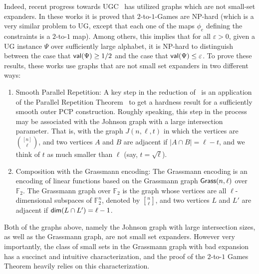 \documentclass[11pt]{article}
\def \eps {{\varepsilon}}
\theoremstyle{definition}
\begin{document}
Indeed, recent progress towards UGC~\cite{KhotMS17,DBLP:conf/stoc/DinurKKMS18a,DinurKKMS18,KhotMS18}
has utilized graphs which are not small-set expanders. In these 
works it is proved that $2$-to-$1$-Games are NP-hard (which is a 
very similar problem to UG, except that 
each one of the maps $\phi_e$ defining the constraints 
is a $2$-to-$1$ map). Among others, this implies that for all $\eps > 0$, given
a UG instance $\Psi$ over sufficiently large alphabet, 
it is NP-hard to distinguish between the case that 
${\sf val}(\Psi)\geq 1/2$ and the case that 
${\sf val}(\Psi)\leq \eps$. To prove these results, these works
use graphs that are not small set expanders in two different ways:
\begin{enumerate}
    \item Smooth Parallel Repetition: A key step in the reduction     of~\cite{KhotMS17,DBLP:conf/stoc/DinurKKMS18a,DinurKKMS18,KhotMS18} is an application of the Parallel Repetition Theorem~\cite{Raz} to get a hardness result 
    for a sufficiently 
    smooth outer PCP construction. Roughly speaking, this 
    step in the process may be associated with the Johnson graph
    with a large intersection parameter. That is, with the graph 
    $J(n,\ell,t)$ in which the vertices are $\binom{[n]}{\ell}$, and 
    two vertices $A$ and $B$ are adjacent if $|A\cap B|=\ell-t$, 
    and we think of $t$ as much smaller than $\ell$ (say, $t=\sqrt{\ell}$).
    \item Composition with the Grassmann encoding: The Grassmann
    encoding is an encoding of linear functions based on the Grassmann graph 
    ${\sf Grass}(n,\ell)$ over $\mathbb{F}_2$. The Grassmann graph 
    over $\mathbb{F}_2$ is the graph whose vertices are all 
    $\ell$-dimensional subspaces of $\mathbb{F}_2^n$, denoted by 
    ${n\brack \ell}$, and two vertices $L$ and $L'$ are adjacent if 
    ${\sf dim}(L\cap L') = \ell-1$. 
\end{enumerate}
Both of the graphs above, namely the Johnson graph with large intersection sizes, as well as the Grassmann graph, are not 
small set expanders. However very importantly, the class
of small sets in the Grassmann graph with bad expansion has a succinct and intuitive characterization, 
and the proof of the $2$-to-$1$ Games Theorem heavily relies on this characterization. 
\end{document}

